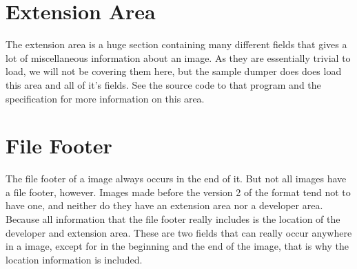 \begin{refsection}
  \section{Extension Area}

  The extension area is a huge section containing many different
  fields that gives a lot of miscellaneous information about an
  image. As they are essentially trivial to load, we will not be
  covering them here, but the sample \tga dumper does does load this
  area and all of it's fields. See the source code to that program and
  the \tga specification for more information on this area.

  \section{\tga File Footer}

  The file footer of a \tga image always occurs in the end of it. But
  not all \tga images have a file footer, however. Images made before
  the version 2 of the \tga format tend not to have one, and neither
  do they have an extension area nor a developer area. Because all
  information that the file footer really includes is the location of
  the developer and extension area. These are two fields that can
  really occur anywhere in a \tga image, except for in the beginning
  and the end of the image, that is why the location information is
  included.

  \printbibliography[heading=subbibliography]

\end{refsection}